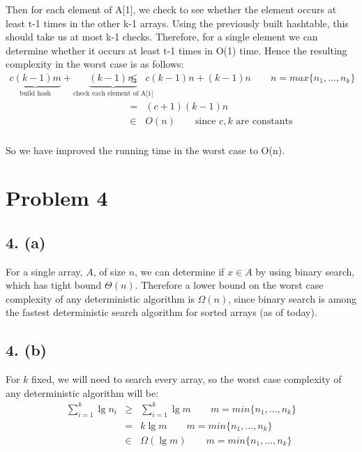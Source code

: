 \documentclass{article}[12pt]
\begin{document}
  Then for each element of A[1], we check to see whether the element occurs at least t-1 times in the other k-1 arrays. Using the previously built hashtable, this should take us at most k-1 checks. Therefore, for a single element we can determine whether it occurs at least t-1 times in O(1) time. Hence the resulting complexity in the worst case is as follows: \\
  \begin{eqnarray*}
    \underbrace{c(k-1)m}_{\textrm{build hash}} + \underbrace{(k-1)n_{1}}_{\textrm{check each element of A[1]}}
    & \leq & c(k-1)n + (k-1)n \qquad n = max\{n_{1}, \ldots, n_{k}\} \\
    & = & (c+1)(k-1)n \\
    & \in & O(n) \qquad \textrm{since $c,k$ are constants} \\
  \end{eqnarray*}

  So we have improved the running time in the worst case to O(n). \\
  
\section*{Problem 4}

\subsection*{4. (a)}
  For a single array, $A$, of size $n$, we can determine if $x \in A$ by using binary search, which has tight bound $\Theta(n)$. Therefore a lower bound on the worst case complexity of any deterministic algorithm is $\Omega(n)$, since binary search is among the fastest deterministic search algorithm for sorted arrays (as of today).

\subsection*{4. (b)}
  For $k$ fixed, we will need to search every array, so the worst case complexity of any deterministic algorithm will be:
  \begin{eqnarray*}
    \sum_{i=1}^k \lg n_{i} & \geq & \sum_{i=1}^k \lg m \qquad m = min\{n_{1}, \ldots, n_{k}\} \\
    & = & k \lg m \qquad m = min\{n_{1}, \ldots, n_{k}\} \\
    & \in & \Omega(\lg m) \qquad m = min\{n_{1}, \ldots, n_{k}\} \\
  \end{eqnarray*}
\end{document}
